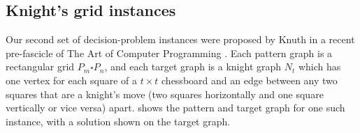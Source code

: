 
\FloatBarrier

\subsection{Knight's grid instances}\label{subsec:si-knights-experiment}

Our second set of decision-problem instances were proposed by Knuth in a recent pre-fascicle
of The Art of Computer Programming \citep{knuth2022art}.  Each pattern graph is a rectangular grid
$P_m \square P_n$, and each target graph is a knight graph $N_t$ which has one vertex for each
square of a $t \times t$ chessboard and an edge between any two squares that are a knight's
move (two squares horizontally and one square vertically or vice versa) apart.
 shows the pattern and target graph for one such instance,
with a solution shown on the target graph.

